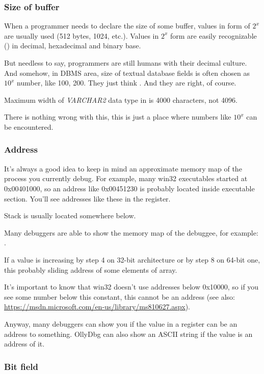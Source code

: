 \subsubsection{Size of buffer}

When a programmer needs to declare the size of some buffer, values in form of $2^x$ are usually used (512 bytes, 1024, etc.).
Values in $2^x$ form are easily recognizable () in decimal, hexadecimal and binary base.

But needless to say, programmers are still humans with their decimal culture.
And somehow, in \ac{DBMS} area, size of textual database fields is often chosen as $10^x$ number, like 100, 200.
They just think .
And they are right, of course.

Maximum width of \emph{VARCHAR2} data type in \oracle is 4000 characters, not 4096.

There is nothing wrong with this, this is just a place where numbers like $10^x$ can be encountered.

\subsubsection{Address}

It's always a good idea to keep in mind an approximate memory map of the process you currently debug.
For example, many win32 executables started at 0x00401000, so an address like 0x00451230 is probably located inside
executable section. You'll see addresses like these in the  register.

Stack is usually located somewhere below. %

Many debuggers are able to show the memory map of the debuggee, for example: .

If a value is increasing by step 4 on 32-bit architecture or by step 8 on 64-bit one,
this probably sliding address of some elements of array.

It's important to know that win32 doesn't use addresses below 0x10000, so if you see some number below this constant,
this cannot be an address (see also: \url{https://msdn.microsoft.com/en-us/library/ms810627.aspx}).

Anyway, many debuggers can show you if the value in a register can be an address to something.
OllyDbg can also show an ASCII string if the value is an address of it.

\subsubsection{Bit field}

